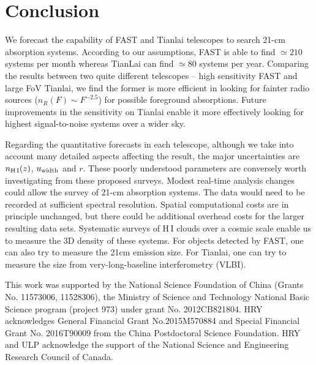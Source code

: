 \documentclass[]{raa}
\newcommand{\HI}{{H{\small\,I}}}
\begin{document}
\section{Conclusion}\label{sec.conclusion}
We forecast the capability of FAST and Tianlai telescopes to search 21-cm
absorption systems. According to our assumptions, FAST is able
to find $\simeq 210$ systems per month
whereas TianLai can find $\simeq 80$ systems per year.
Comparing the results between two quite different telescopes --
high sensitivity FAST and large FoV Tianlai, we find the former is
more efficient in looking for fainter radio sources
($n_R(F)\sim F^{-2.5}$) for possible foreground absorptions.
Future improvements in the sensitivity on Tianlai enable it
more effectively looking for highest signal-to-noise systems
over a wider sky.

Regarding the quantitative forecasts in each telescope, although we take
into account many detailed aspects affecting the result, the major
uncertainties are $n_{\rm \HI}(z)$, $u_{\rm width}$ and $r$.
These poorly understood parameters are conversely worth investigating
from these proposed surveys. Modest real-time analysis changes could
allow the survey of 21-cm absorption systems. The data would need to be
recorded at sufficient spectral resolution. Spatial computational costs are
in principle unchanged, but there could be additional overhead
costs for the larger resulting data sets. Systematic surveys of
{\HI} clouds over a cosmic scale enable us to measure the 3D density
of these systems. For objects detected by FAST, one can also try to measure
the 21cm emission size. For Tianlai, one can try to measure the size from
very-long-baseline interferometry (VLBI).


\begin{acknowledgements}
This work was supported by the National Science Foundation of China (Grants No. 11573006, 11528306), the Ministry of Science and Technology National Basic Science program (project 973) under grant No. 2012CB821804.
HRY acknowledges General Financial Grant No.2015M570884 and
Special Financial Grant No. 2016T90009 from the China
Postdoctoral Science Foundation.
HRY and ULP acknowledge the support of the
National Science and Engineering Research Council of Canada.
\end{acknowledgements}



\end{document}

